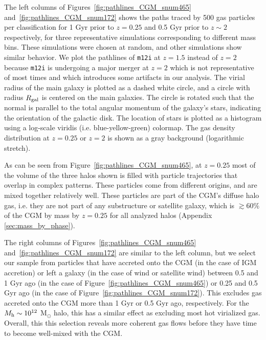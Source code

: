 \documentclass[fleqn,usenatbib]{mnras}
\begin{document}
The left columns of Figures~\ref{fig:pathlines_CGM_snum465} and~\ref{fig:pathlines_CGM_snum172} shows the paths traced by 500 gas particles per classification for 1 Gyr prior to $z=0.25$ and 0.5 Gyr prior to $z\sim2$ respectively, for three representative simulations corresponding to different mass bins.
These simulations were chosen at random, and other simulations show similar behavior.
We plot the pathlines of \texttt{m12i} at $z=1.5$ instead of $z=2$ because \texttt{m12i} is undergoing a major merger at $z=2$ which is not representative of most times and which introduces some artifacts in our analysis.
The virial radius of the main galaxy is plotted as a dashed white circle, and a circle with radius $R_{\rm gal}$ is centered on the main galaxies. The circle is rotated such that the normal is parallel to the total angular momentum of the galaxy's stars, indicating the orientation of the galactic disk.
The location of stars is plotted as a histogram using a log-scale viridis (i.e. blue-yellow-green) colormap.
The gas density distribution at $z=0.25$ or $z=2$ is shown as a gray background (logarithmic stretch). 

As can be seen from Figure~\ref{fig:pathlines_CGM_snum465}, at $z=0.25$ most of the volume of the three halos shown is filled with particle trajectories that overlap in complex patterns.
These particles come from different origins, and are mixed together relatively well.
These particles are part of the CGM's diffuse halo gas, i.e. they are not part of any substructure or satellite galaxy, which is $\gtrsim 60\%$ of the CGM by mass by $z=0.25$ for all analyzed halos (Appendix \ref{sec:mass_by_phase}).

The right columns of Figures~\ref{fig:pathlines_CGM_snum465} and~\ref{fig:pathlines_CGM_snum172} are similar to the left column, but we select our sample from particles that have accreted onto the CGM (in the case of IGM accretion) or left a galaxy (in the case of wind or satellite wind) between 0.5 and 1 Gyr ago (in the case of Figure~\ref{fig:pathlines_CGM_snum465}) or 0.25 and 0.5 Gyr ago (in the case of Figure~\ref{fig:pathlines_CGM_snum172}). 
This excludes gas accreted onto the CGM more than 1 Gyr or 0.5 Gyr ago, respectively.
For the $M_{\rm h} \sim 10^{12}$ M$_{\odot}$ halo, this has a similar effect as excluding most hot virialized gas.
Overall, this this selection reveals more coherent gas flows before they have time to become well-mixed with the CGM.
\end{document}
